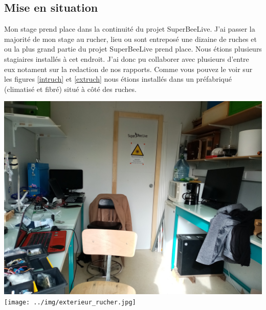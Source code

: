 \documentclass[12pt,french,a4paper]{article}
\begin{document}
\subsection{Mise en situation}
Mon stage prend place dans la continuité du projet SuperBeeLive. J'ai passer la majorité de mon stage au rucher, lieu ou sont entreposé une dizaine de ruches et ou la plus grand partie du projet SuperBeeLive prend place.
Nous étions plusieurs stagiaires installés à cet endroit. J'ai donc pu collaborer avec plusieurs d'entre eux notament sur la redaction de nos rapports. Comme vous pouvez le voir sur les figures \ref{intruch} et \ref{extruch}  nous étions installés dans un préfabriqué (climatisé et fibré) situé à côté des ruches.

\begin{center}	
\includegraphics[scale=0.075]{../img/interieur_rucher.jpg}
\label{intruch}
\texttt{[image: ../img/exterieur\_rucher.jpg]}
\label{extruch}
\end{center}
\end{document}
